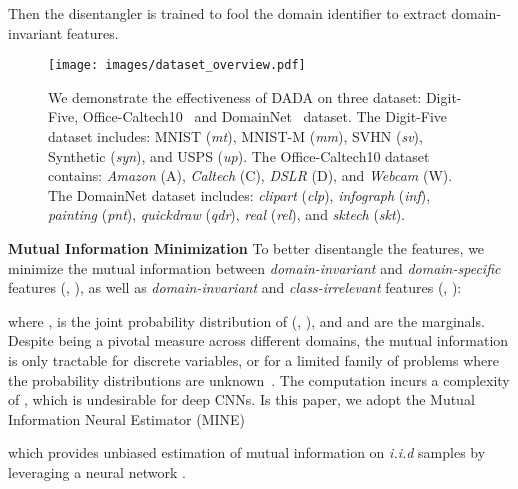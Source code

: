 \documentclass{article}
\begin{document}
Then the disentangler is trained to fool the domain identifier  to extract domain-invariant features.


\begin{figure*}[t]
    \centering
    \texttt{[image: images/dataset\_overview.pdf]}
    \vspace{-0.6cm}
    \caption{We demonstrate the effectiveness of DADA on three dataset: Digit-Five, Office-Caltech10~\cite{gong2012geodesic} and DomainNet~\cite{domainnet} dataset. The Digit-Five dataset includes: MNIST (\textit{mt}), MNIST-M (\textit{mm}), SVHN (\textit{sv}), Synthetic (\textit{syn}), and USPS (\textit{up}). The Office-Caltech10 dataset contains: \textit{Amazon} (A), \textit{Caltech} (C), \textit{DSLR} (D), and \textit{Webcam} (W). The DomainNet dataset includes: \textit{clipart} (\textit{clp}), \textit{infograph} (\textit{inf}), \textit{painting} (\textit{pnt}), \textit{quickdraw} (\textit{qdr}), \textit{real} (\textit{rel}), and \textit{sktech} (\textit{skt}).} 

    \label{fig_dataset_overview}
\end{figure*} \newcommand{\PJ}[2]{\mathbb{P}_{#1#2}} 
\newcommand{\PJE}[2]{\mathbb{P}^{n}_{#1#2}}  
\newcommand{\PI}[2]{\mathbb{P}_{#1}\otimes\mathbb{P}_{#2}}  
\textbf{Mutual Information Minimization} To better disentangle the features, we minimize the mutual information between \textit{domain-invariant} and \textit{domain-specific} features (, ), as well as \textit{domain-invariant} and \textit{class-irrelevant} features (, ):


where ,  is the joint probability distribution of (, ), and  and  are the marginals. Despite being a pivotal measure across different domains, the mutual information is only tractable for discrete variables, or for a limited family of problems where the probability distributions are unknown~\cite{mine}. The computation incurs a complexity of , which is undesirable for deep CNNs. Is this paper, we adopt the Mutual Information Neural Estimator (MINE)~\cite{mine}

 

which provides unbiased estimation of mutual information on  \textit{i.i.d} samples by leveraging a neural network . 
\end{document}
